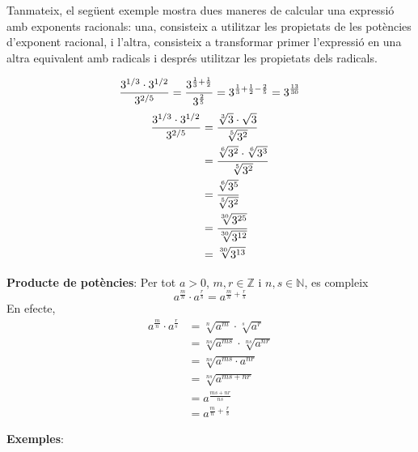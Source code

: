 Tanmateix, el següent exemple mostra dues maneres de calcular una expressió amb exponents racionals: una, consisteix a utilitzar les propietats
de les potències d’exponent racional, i l’altra, consisteix a transformar
primer l’expressió en una altra equivalent amb radicals i després
utilitzar les propietats dels radicals.

\begin{equation*}
\frac{3^{1/3}\cdot 3^{1/2}}{3^{2/5}}=\frac{3^{\frac{1}{3}+\frac{1}{2}}}{3^{%
\frac{2}{5}}}=3^{\frac{1}{3}+\frac{1}{2}-\frac{2}{5}}=3^{\frac{13}{30}}
\end{equation*}%
\begin{align*}
\frac{3^{1/3}\cdot 3^{1/2}}{3^{2/5}} &=\frac{\sqrt[3]{3}\cdot \sqrt{3}}{%
\sqrt[5]{3^{2}}} \\
&=\frac{\sqrt[6]{3^{2}}\cdot \sqrt[6]{3^{3}}}{\sqrt[5]{3^{2}}} \\
&=\frac{\sqrt[6]{3^{5}}}{\sqrt[5]{3^{2}}} \\
&=\frac{\sqrt[30]{3^{25}}}{\sqrt[30]{3^{12}}} \\
&=\sqrt[30]{3^{13}}
\end{align*}

\textbf{Producte de potències}: Per tot $a>0$, $m,r\in \mathbb{Z}$ i $%
n,s\in \mathbb{N}$, es compleix%
\begin{equation*}
a^{\frac{m}{n}}\cdot a^{\frac{r}{s}}=a^{\frac{m}{n}+\frac{r}{s}}
\end{equation*}%
En efecte,%
\begin{align*}
a^{\frac{m}{n}}\cdot a^{\frac{r}{s}} &=\sqrt[n]{a^{m}}\cdot \sqrt[s]{a^{r}}
\\
&=\sqrt[ns]{a^{ms}}\cdot \sqrt[ns]{a^{nr}} \\
&=\sqrt[ns]{a^{ms}\cdot a^{nr}} \\
&=\sqrt[ns]{a^{ms+nr}} \\
&=a^{\frac{ms+nr}{ns}} \\
&=a^{\frac{m}{n}+\frac{r}{s}}
\end{align*}

\textbf{Exemples}:

